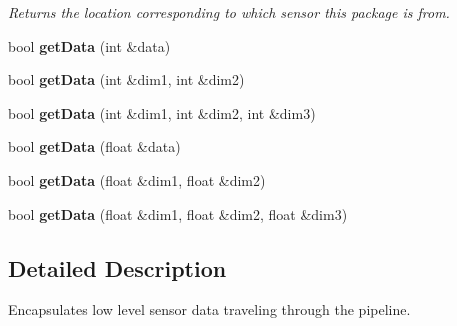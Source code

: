 \begin{DoxyCompactItemize}
\begin{DoxyCompactList}\small\item\em Returns the location corresponding to which sensor this package is from. \end{DoxyCompactList}\item 
bool {\bfseries get\+Data} (int \&data)\hypertarget{class_bottle_buddy_1_1_embedded_1_1_pipeline_1_1_package_a6dddf8a0ef79d947a4cef0b2e349af6b}{}\label{class_bottle_buddy_1_1_embedded_1_1_pipeline_1_1_package_a6dddf8a0ef79d947a4cef0b2e349af6b}

\item 
bool {\bfseries get\+Data} (int \&dim1, int \&dim2)\hypertarget{class_bottle_buddy_1_1_embedded_1_1_pipeline_1_1_package_a6ad1e786cdc50c7582dc26b3157ae593}{}\label{class_bottle_buddy_1_1_embedded_1_1_pipeline_1_1_package_a6ad1e786cdc50c7582dc26b3157ae593}

\item 
bool {\bfseries get\+Data} (int \&dim1, int \&dim2, int \&dim3)\hypertarget{class_bottle_buddy_1_1_embedded_1_1_pipeline_1_1_package_a977cec6790ace8b8fa4c7d9615ba0c76}{}\label{class_bottle_buddy_1_1_embedded_1_1_pipeline_1_1_package_a977cec6790ace8b8fa4c7d9615ba0c76}

\item 
bool {\bfseries get\+Data} (float \&data)\hypertarget{class_bottle_buddy_1_1_embedded_1_1_pipeline_1_1_package_a81c5856398146b39b1223f0e2644efd5}{}\label{class_bottle_buddy_1_1_embedded_1_1_pipeline_1_1_package_a81c5856398146b39b1223f0e2644efd5}

\item 
bool {\bfseries get\+Data} (float \&dim1, float \&dim2)\hypertarget{class_bottle_buddy_1_1_embedded_1_1_pipeline_1_1_package_afa39a20f1a710af1fd7ccf20b9883be4}{}\label{class_bottle_buddy_1_1_embedded_1_1_pipeline_1_1_package_afa39a20f1a710af1fd7ccf20b9883be4}

\item 
bool {\bfseries get\+Data} (float \&dim1, float \&dim2, float \&dim3)\hypertarget{class_bottle_buddy_1_1_embedded_1_1_pipeline_1_1_package_ae42a459cd0780733c9d4700814a26672}{}\label{class_bottle_buddy_1_1_embedded_1_1_pipeline_1_1_package_ae42a459cd0780733c9d4700814a26672}

\end{DoxyCompactItemize}


\subsection{Detailed Description}
Encapsulates low level sensor data traveling through the pipeline. 

